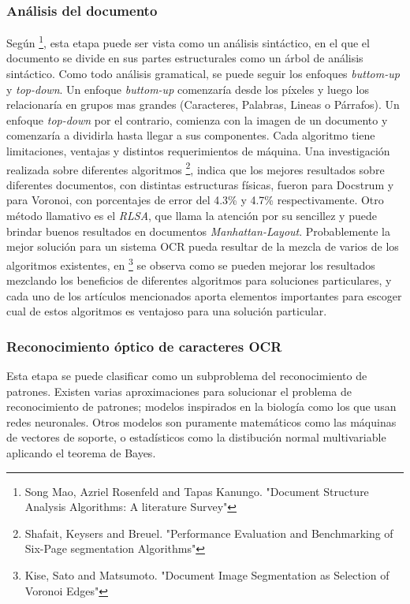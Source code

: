 \documentclass[a4paper, 11pt, oneside]{article}
\begin{document}
	\subsubsection{Análisis del documento}
	Según \footnote{Song Mao, Azriel Rosenfeld and Tapas Kanungo. "Document Structure Analysis
	Algorithms: A literature Survey"}, esta etapa puede ser vista como un análisis sintáctico,
	en el que el documento se divide en sus partes estructurales como un árbol de análisis
	sintáctico. Como todo análisis gramatical, se puede seguir los enfoques
	\textit{buttom-up} y \textit{top-down}. Un enfoque \textit{buttom-up} comenzaría desde
	los píxeles y luego los relacionaría en grupos mas grandes (Caracteres, Palabras, Lineas
	o Párrafos). Un enfoque \textit{top-down} por el contrario, comienza con la imagen de un
	documento y comenzaría a dividirla hasta llegar a sus componentes.
	Cada algoritmo tiene limitaciones, ventajas y distintos requerimientos de máquina.
	Una investigación realizada sobre diferentes algoritmos \footnote{Shafait, Keysers and Breuel.
	"Performance Evaluation and Benchmarking of Six-Page segmentation Algorithms"}, indica que los
	mejores resultados sobre diferentes documentos, con distintas estructuras físicas,
	fueron para Docstrum y para Voronoi, con porcentajes de error del 4.3\% y 4.7\% respectivamente.
	Otro método	llamativo es el \textit{RLSA}, que llama la atención por su sencillez y puede brindar
	buenos resultados en documentos \textit{Manhattan-Layout}.
	Probablemente la mejor solución para un sistema OCR pueda resultar de la mezcla de
	varios de los algoritmos existentes, en \footnote{Kise, Sato and Matsumoto. "Document Image 
	Segmentation as Selection of Voronoi Edges"} se observa como se pueden mejorar
	los resultados mezclando los beneficios de diferentes algoritmos para soluciones
	particulares, y cada uno de los artículos mencionados aporta elementos importantes para
    escoger cual de estos algoritmos es ventajoso para una solución particular.
	
	\subsubsection{Reconocimiento óptico de caracteres OCR}
	Esta etapa se puede clasificar como un subproblema del reconocimiento de patrones.
	Existen varias aproximaciones para solucionar el problema de reconocimiento de patrones; 
	modelos inspirados en la biología como los que usan redes neuronales. Otros modelos
	son puramente matemáticos como las máquinas de vectores de soporte, o estadísticos
	como la distibución normal multivariable aplicando el teorema de Bayes.
\end{document}
